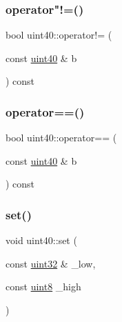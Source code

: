 \mbox{\label{classuint40_af17f2004231903079eb4e36b64c96180}} 
\subsubsection{\texorpdfstring{operator"!=()}{operator!=()}}
{\footnotesize\ttfamily bool uint40\+::operator!= (\begin{DoxyParamCaption}\item[{const \hyperlink{classuint40}{uint40} \&}]{b }\end{DoxyParamCaption}) const\hspace{0.3cm}{\ttfamily [inline]}}

\mbox{\label{classuint40_afa6fa84dfd61e527efa6e4457abc2d81}} 
\subsubsection{\texorpdfstring{operator==()}{operator==()}}
{\footnotesize\ttfamily bool uint40\+::operator== (\begin{DoxyParamCaption}\item[{const \hyperlink{classuint40}{uint40} \&}]{b }\end{DoxyParamCaption}) const\hspace{0.3cm}{\ttfamily [inline]}}

\mbox{\label{classuint40_ab23ea17f6248ac0e7dbacbb71a96179b}} 
\subsubsection{\texorpdfstring{set()}{set()}}
{\footnotesize\ttfamily void uint40\+::set (\begin{DoxyParamCaption}\item[{const \hyperlink{types_8h_a8f95e75e58492e87412191fabadd8ca8}{uint32} \&}]{\+\_\+low,  }\item[{const \hyperlink{types_8h_a115946cb5fc5879545e9ccea096a6031}{uint8}}]{\+\_\+high }\end{DoxyParamCaption})\hspace{0.3cm}{\ttfamily [inline]}}

